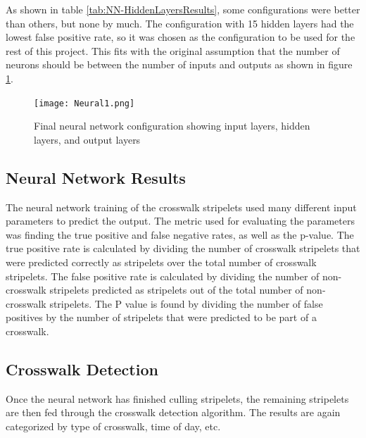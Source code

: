 \documentclass[12pt]{ucthesis}
\newcommand{\captionfonts}{\small\bf\ssp}
\begin{document}
As shown in table \ref{tab:NN-HiddenLayersResults}, some configurations were better than others, but none by much. The configuration with 15 hidden layers had the lowest false positive rate, so it was chosen as the configuration to be used for the rest of this project. This fits with the original assumption that the number of neurons should be between the number of inputs and outputs as shown in figure \ref{fig:Neural1png}. 

\begin{figure}[H]
\begin{center}
\texttt{[image: Neural1.png]}
\captionfonts
\caption[Final Neural Network Configuration]{Final neural network configuration showing input layers, hidden layers, and output layers}
\label{fig:Neural1png}
\end{center}
\end{figure}

\subsection{Neural Network Results}

The neural network training of the crosswalk stripelets used many different input parameters to predict the output. The metric used for evaluating the parameters was finding the true positive and false negative rates, as well as the p-value. The true positive rate is calculated by dividing the number of crosswalk stripelets that were predicted correctly as stripelets over the total number of crosswalk stripelets. The false positive rate is calculated by dividing the number of non-crosswalk stripelets predicted as stripelets out of the total number of non-crosswalk stripelets. The P value is found by dividing the number of false positives by the number of stripelets that were predicted to be part of a crosswalk.  


\subsection{Crosswalk Detection}
Once the neural network has finished culling stripelets, the remaining stripelets are then fed through the crosswalk detection algorithm. The results are again categorized by type of crosswalk, time of day, etc. 
\end{document}
